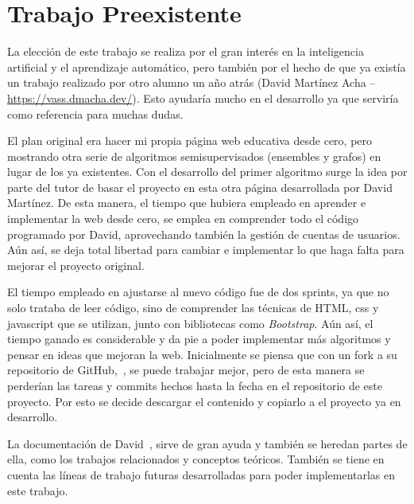 \section{Trabajo Preexistente}
La elección de este trabajo se realiza por el gran interés en la inteligencia artificial y el aprendizaje automático, pero también por el hecho de que ya existía un trabajo realizado por otro alumno un año atrás (David Martínez Acha -- \url{https://vass.dmacha.dev/}). Esto ayudaría mucho en el desarrollo ya que serviría como referencia para muchas dudas.

El plan original era hacer mi propia página web educativa desde cero, pero mostrando otra serie de algoritmos semisupervisados (ensembles y grafos) en lugar de los ya existentes. Con el desarrollo del primer algoritmo surge la idea por parte del tutor de basar el proyecto en esta otra página desarrollada por David Martínez. De esta manera, el tiempo que hubiera empleado en aprender e implementar la web desde cero, se emplea en comprender todo el código programado por David, aprovechando también la gestión de cuentas de usuarios. Aún así, se deja total libertad para cambiar e implementar lo que haga falta para mejorar el proyecto original.

El tiempo empleado en ajustarse al nuevo código fue de dos sprints, ya que no solo trataba de leer código, sino de comprender las técnicas de HTML, css y javascript que se utilizan, junto con bibliotecas como \textit{Bootstrap}.
Aún así, el tiempo ganado es considerable y da pie a poder implementar más algoritmos y pensar en ideas que mejoran la web.
Inicialmente se piensa que con un fork a su repositorio de GitHub,~\cite{GH:VASS}, se puede trabajar mejor, pero de esta manera se perderían las tareas y commits hechos hasta la fecha en el repositorio de este proyecto. Por esto se decide descargar el contenido y copiarlo a el proyecto ya en desarrollo.

La documentación de David~\cite{TFG:David}, sirve de gran ayuda y también se heredan partes de ella, como los trabajos relacionados y conceptos teóricos. También se tiene en cuenta las líneas de trabajo futuras desarrolladas para poder implementarlas en este trabajo.
